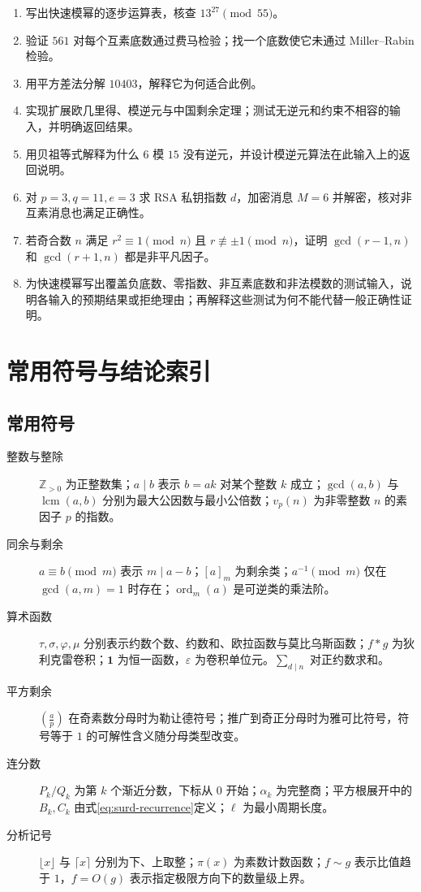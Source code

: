\documentclass[UTF8,12pt,a4paper,fontset=fandol]{ctexbook}
\begin{document}
\begin{enumerate}
 \item 写出快速模幂的逐步运算表，核查 $13^{27}\pmod{55}$。
 \item 验证 $561$ 对每个互素底数通过费马检验；找一个底数使它未通过 Miller--Rabin 检验。
 \item 用平方差法分解 $10403$，解释它为何适合此例。
 \item 实现扩展欧几里得、模逆元与中国剩余定理；测试无逆元和约束不相容的输入，并明确返回结果。
 \item\label{ex:algo-inverse-fail} 用贝祖等式解释为什么 $6$ 模 $15$ 没有逆元，并设计模逆元算法在此输入上的返回说明。
 \item\label{ex:algo-rsa-small} 对 $p=3,q=11,e=3$ 求 RSA 私钥指数 $d$，加密消息 $M=6$ 并解密，核对非互素消息也满足正确性。
 \item\label{ex:algo-sqrt-factor} 若奇合数 $n$ 满足 $r^2\equiv1\pmod n$ 且 $r\not\equiv\pm1\pmod n$，证明 $\gcd(r-1,n)$ 和 $\gcd(r+1,n)$ 都是非平凡因子。
 \item\label{ex:algo-test-cases} 为快速模幂写出覆盖负底数、零指数、非互素底数和非法模数的测试输入，说明各输入的预期结果或拒绝理由；再解释这些测试为何不能代替一般正确性证明。
\end{enumerate}

\appendix

\chapter{常用符号与结论索引}
\label{app:reference}

\section{常用符号}
\begin{description}
 \item[整数与整除] $\mathbb Z_{>0}$ 为正整数集；$a\mid b$ 表示 $b=ak$ 对某个整数 $k$ 成立；$\gcd(a,b)$ 与 $\operatorname{lcm}(a,b)$ 分别为最大公因数与最小公倍数；$v_p(n)$ 为非零整数 $n$ 的素因子 $p$ 的指数。
 \item[同余与剩余] $a\equiv b\pmod m$ 表示 $m\mid a-b$；$[a]_m$ 为剩余类；$a^{-1}\pmod m$ 仅在 $\gcd(a,m)=1$ 时存在；$\operatorname{ord}_m(a)$ 是可逆类的乘法阶。
 \item[算术函数] $\tau,\sigma,\varphi,\mu$ 分别表示约数个数、约数和、欧拉函数与莫比乌斯函数；$f*g$ 为狄利克雷卷积；$\mathbf1$ 为恒一函数，$\varepsilon$ 为卷积单位元。$\sum_{d\mid n}$ 对正约数求和。
 \item[平方剩余] $\left(\frac ap\right)$ 在奇素数分母时为勒让德符号；推广到奇正分母时为雅可比符号，符号等于 $1$ 的可解性含义随分母类型改变。
 \item[连分数] $P_k/Q_k$ 为第 $k$ 个渐近分数，下标从 $0$ 开始；$\alpha_k$ 为完整商；平方根展开中的 $B_k,C_k$ 由式\eqref{eq:surd-recurrence}定义；$\ell$ 为最小周期长度。
 \item[分析记号] $\lfloor x\rfloor$ 与 $\lceil x\rceil$ 分别为下、上取整；$\pi(x)$ 为素数计数函数；$f\sim g$ 表示比值趋于 $1$，$f=O(g)$ 表示指定极限方向下的数量级上界。
\end{description}
\end{document}
